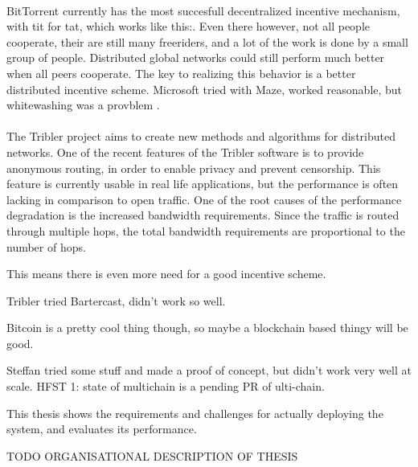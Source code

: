 \\
BitTorrent \cite{} currently has the most succesfull decentralized  incentive mechanism, with tit for tat, which works like this:. Even there however, not all people cooperate, their are still many freeriders, and a lot of the work is done by a small group of people. 
Distributed global networks could still perform much better when all peers cooperate. The key to realizing this behavior is a better distributed incentive scheme.
Microsoft tried with Maze, worked reasonable, but whitewashing was a provblem \cite{yang2005empirical}.\\
\\
The Tribler project aims to create new methods and algorithms for distributed networks. One of the recent features of the Tribler software is to provide anonymous routing, in order to enable privacy and prevent censorship. This feature is currently usable in real life applications, but the performance is often lacking in comparison to open traffic. One of the root causes of the performance degradation is the increased bandwidth requirements. Since the traffic is routed through multiple hops, the total bandwidth requirements are proportional to the number of hops.  

This means there is even more need for a good incentive scheme.

Tribler tried Bartercast, didn't work so well.


Bitcoin is a pretty cool thing though, so maybe a blockchain based thingy will be good.

Steffan tried some stuff and made a proof of concept, but didn't work very well at scale.
HFST 1: state of multichain is a pending PR of ulti-chain.

This thesis shows the requirements and challenges for actually deploying the system, and evaluates its performance.



TODO ORGANISATIONAL DESCRIPTION OF THESIS

